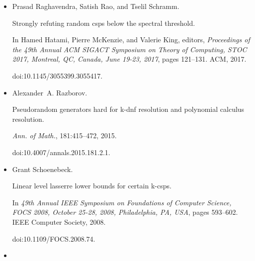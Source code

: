 \documentclass[10pt,a4paper]{article}
\begin{document}
\begin{itemize}
Shuo Pang.


Large clique is hard on average for resolution.


In Rahul Santhanam and Daniil Musatov, editors, \emph{Computer Science
- Theory and Applications - 16th International Computer Science Symposium in
Russia, CSR 2021, Sochi, Russia, June 28 - July 2, 2021, Proceedings},
volume 12730 of \emph{Lecture Notes in Computer Science}, pages 361–380.
Springer, 2021.


doi:10.1007/978-3-030-79416-3\_22.





\item[] 
[32]

Prasad Raghavendra, Satish Rao, and Tselil Schramm.


Strongly refuting random csps below the spectral threshold.


In Hamed Hatami, Pierre McKenzie, and Valerie King, editors, \emph{Proceedings of the 49th Annual ACM SIGACT Symposium on Theory of
Computing, STOC 2017, Montreal, QC, Canada, June 19-23, 2017}, pages
121–131. ACM, 2017.


doi:10.1145/3055399.3055417.





\item[] 
[33]

Alexander A. Razborov.


Pseudorandom generators hard for k-dnf resolution and polynomial
calculus resolution.


\emph{Ann. of Math.}, 181:415–472, 2015.


doi:10.4007/annals.2015.181.2.1.





\item[] 
[34]

Grant Schoenebeck.


Linear level lasserre lower bounds for certain k-csps.


In \emph{49th Annual IEEE Symposium on Foundations of Computer
Science, FOCS 2008, October 25-28, 2008, Philadelphia, PA, USA}, pages
593–602. IEEE Computer Society, 2008.


doi:10.1109/FOCS.2008.74.





\item[] 
[35]


\end{itemize}
\end{document}
